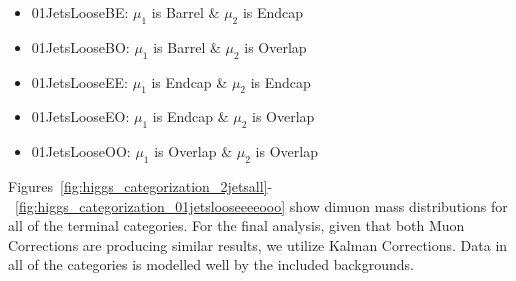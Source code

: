 \begin{itemize}
\begin{itemize}
\begin{itemize}
          \item 01JetsLooseBE: $\mu_{1}$ is Barrel \& $\mu_2$ is Endcap
          \item 01JetsLooseBO: $\mu_{1}$ is Barrel \& $\mu_2$ is Overlap
          \item 01JetsLooseEE: $\mu_{1}$ is Endcap \& $\mu_2$ is Endcap
          \item 01JetsLooseEO: $\mu_{1}$ is Endcap \& $\mu_2$ is Overlap
          \item 01JetsLooseOO: $\mu_{1}$ is Overlap \& $\mu_2$ is Overlap
        \end{itemize}
    \end{itemize}
\end{itemize}

Figures~\ref{fig:higgs_categorization_2jetsall}-~\ref{fig:higgs_categorization_01jetslooseeeeooo} show dimuon mass distributions for all of the terminal categories. For the final analysis, given that both Muon Corrections are producing similar results, we utilize Kalman Corrections. Data in all of the categories is modelled well by the included backgrounds.
